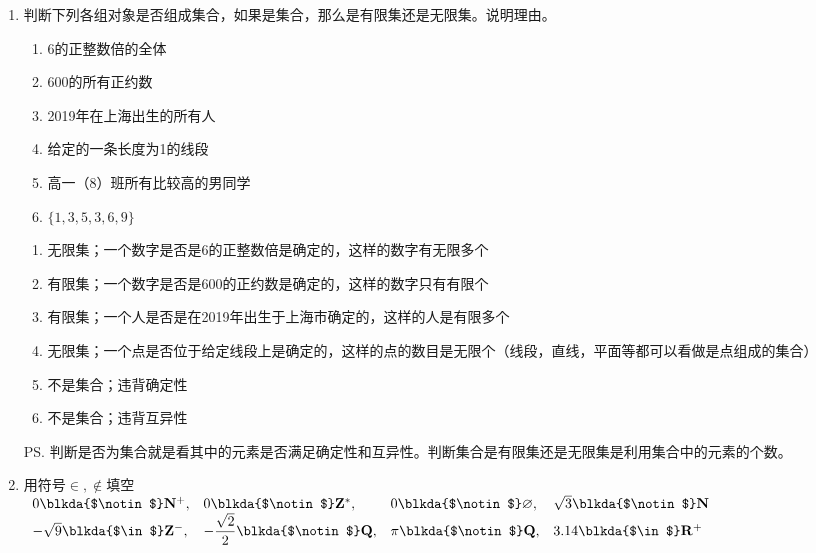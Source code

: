 \begin{enumerate}
    \item 判断下列各组对象是否组成集合，如果是集合，那么是有限集还是无限集。说明理由。
    \begin{enumerate}
        \item 6的正整数倍的全体
        \item 600的所有正约数
        \item 2019年在上海出生的所有人
        \item 给定的一条长度为1的线段
        \item 高一（8）班所有比较高的男同学
        \item $\{1, 3, 5, 3, 6, 9\}$
    \end{enumerate}
    \begin{jieda}
        \begin{enumerate}
            \item 无限集；一个数字是否是6的正整数倍是确定的，这样的数字有无限多个
            \item 有限集；一个数字是否是600的正约数是确定的，这样的数字只有有限个
            \item 有限集；一个人是否是在2019年出生于上海市确定的，这样的人是有限多个
            \item 无限集；一个点是否位于给定线段上是确定的，这样的点的数目是无限个（线段，直线，平面等都可以看做是点组成的集合）
            \item 不是集合；违背确定性
            \item 不是集合；违背互异性
        \end{enumerate}
        \ps 判断是否为集合就是看其中的元素是否满足确定性和互异性。判断集合是有限集还是无限集是利用集合中的元素的个数。
    \end{jieda}
    \item 用符号$\in , \notin$填空\\
        $\begin{array}{llll}
             0  \blkda{$\notin$}  \mathbf{N^+}, &  0   \blkda{$\notin$}   \mathbf{Z^*},  & 0   \blkda{$\notin$}   \varnothing, &  \sqrt{3}   \blkda{$\notin$}   \mathbf{N} \\
             -\sqrt{9}  \blkda{$\in$}  \mathbf{Z^-}, &   -\dfrac{\sqrt{2}}{2}   \blkda{$\notin$}   \mathbf{Q}, &   \pi   \blkda{$\notin$}   \mathbf{Q}, &  3.14   \blkda{$\in$}   \mathbf{R^+} \\
        \end{array}$
        

\end{enumerate}
